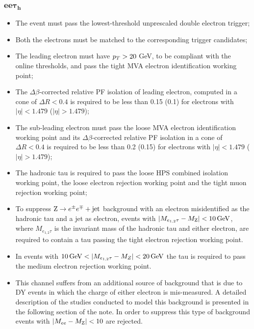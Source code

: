 \subsubsection{$\boldsymbol{ee\tau_h}$}
\begin{itemize}
\item The event must pass the lowest-threshold unprescaled double electron trigger; 
\item Both the electrons must be matched to the corresponding trigger candidates;
\item The leading electron must have $p_{T} > 20$ GeV, to be compliant with the online thresholds, and pass the tight MVA electron identification working point;
\item The $\Delta \beta$-corrected relative PF isolation of leading electron, computed in a cone of $\Delta R < 0.4$ is required to be less than 0.15 (0.1) for electrons with $|\eta| < 1.479$ ($|\eta| > 1.479$);
\item The sub-leading electron must pass the loose MVA electron identification working point and its $\Delta \beta$-corrected relative PF isolation in a cone of $\Delta R < 0.4$ is required to be less than 0.2 (0.15) for electrons with $|\eta| < 1.479$ ($|\eta| > 1.479$);
\item The hadronic tau is required to pass the loose HPS combined isolation working point, the loose electron rejection working point and the tight muon rejection working point;
\item To suppress $\mathrm{Z}\rightarrow e^\pm e^\mp+\mathrm{jet}$ background with an electron misidentified as the hadronic tau and a jet as electron, events with $|M_{e_{1,2}\tau} - M_{\mathrm{Z}}| < 10\, \mathrm{GeV}$, where $M_{e_{1,2}\tau}$ is the invariant mass of the hadronic tau and either electron, are required to contain a tau passing the tight electron rejection working point.                                                                         
\item In events with $10\, \mathrm{GeV} < |M_{e_{1,2}\tau} - M_Z| < 20\, \mathrm{GeV}$ the tau is required to pass the medium electron rejection working point.                                                               
\item This channel suffers from an additional source of background that is due to DY events in which the charge of either electron is mis-measured. %
A detailed description of the studies conducted to model this background is presented in the following section of the note. In order to suppress this type of background events with $|M_{ee} - M_{\mathrm{Z}}| < 10$ are rejected.                                                                                                                                                                 
\end{itemize}

